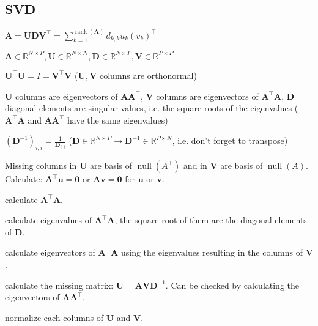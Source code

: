 \documentclass[a4paper, 11pt, landscape]{article}
\begin{document}
\begin{multicols*}{3}
\section{SVD}
\begin{compactitem}
	\item $\mathbf{A} = \mathbf{U} \mathbf{D} \mathbf{V}^\top = \sum_{k=1}^{\operatorname{rank}(\mathbf{A})} d_{k,k} u_k (v_k)^\top$
	\item $\mathbf{A} \in \mathbb{R}^{N \times P}, \mathbf{U} \in \mathbb{R}^{N \times N}, \mathbf{D} \in \mathbb{R}^{N \times P}, \mathbf{V} \in \mathbb{R}^{P \times P}$
	\item $\mathbf{U}^\top \mathbf{U} = I = \mathbf{V}^\top \mathbf{V}$ ($\mathbf{U}, \mathbf{V}$ columns are orthonormal)
	\item $\mathbf{U}$ columns are eigenvectors of $\mathbf{A} \mathbf{A}^\top$, $\mathbf{V}$ columns are eigenvectors of $\mathbf{A}^\top \mathbf{A}$, $\mathbf{D}$ diagonal elements are singular values, i.e. the square roots of the eigenvalues ($\mathbf{A}^\top \mathbf{A}$ and $\mathbf{A} \mathbf{A}^\top$ have the same eigenvalues)
	\item $(\mathbf{D}^{-1})_{i,i} = \frac{1}{\mathbf{D}_{i, i}}$ ($\mathbf{D} \in \mathbb{R}^{N \times P} \to \mathbf{D}^{-1} \in \mathbb{R}^{P \times N}$, i.e. don't forget to transpose)
	\item Missing columns in $\mathbf{U}$ are basis of $\operatorname{null}(A^\top)$ and in $\mathbf{V}$ are basis of $\operatorname{null}(A)$. Calculate: $\mathbf{A}^\top \mathbf{u} = \mathbf{0}$ or $\mathbf{A} \mathbf{v} = \mathbf{0}$ for $\mathbf{u}$ or $\mathbf{v}$.
\end{compactitem}

\begin{compactenum}
	\item calculate $\mathbf{A}^\top \mathbf{A}$.
	\item calculate eigenvalues of $\mathbf{A}^\top \mathbf{A}$, the square root of them are the diagonal elements of $\mathbf{D}$.
	\item calculate eigenvectors of $\mathbf{A}^\top \mathbf{A}$ using the eigenvalues resulting in the columns of $\mathbf{V}$.
	\item calculate the missing matrix: $\mathbf{U} = \mathbf{A} \mathbf{V} \mathbf{D}^{-1}$. Can be checked by calculating the eigenvectors of $\mathbf{A} \mathbf{A}^\top$.
	\item normalize each columns of $\mathbf{U}$ and $\mathbf{V}$.
\end{compactenum}


\end{multicols*}
\end{document}
